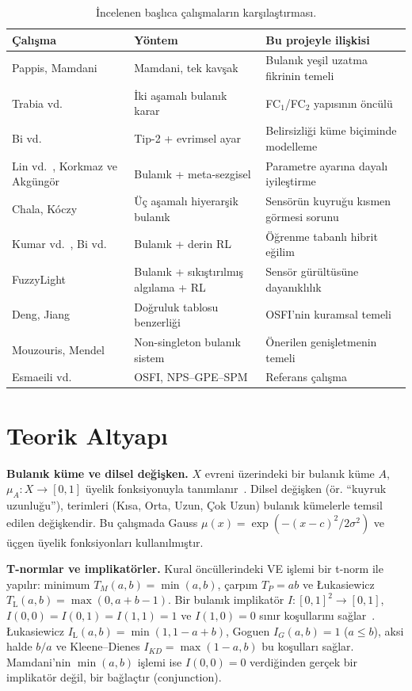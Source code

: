 \documentclass[11pt,a4paper]{article}
\theoremstyle{definition}
\newcommand{\Luk}{\mathrm{L}}
\begin{document}
\begin{table}[t]
\centering
\caption{İncelenen başlıca çalışmaların karşılaştırması.}
\label{tab:lit}
\small
\begin{tabularx}{\textwidth}{@{}p{3.1cm}p{3.6cm}X@{}}
\toprule
Çalışma & Yöntem & Bu projeyle ilişkisi \\
\midrule
Pappis, Mamdani~\cite{pappis1977} & Mamdani, tek kavşak & Bulanık yeşil uzatma fikrinin temeli \\
Trabia vd.~\cite{trabia1999} & İki aşamalı bulanık karar & FC$_1$/FC$_2$ yapısının öncülü \\
Bi vd.~\cite{bi2014,bi2018} & Tip-2 + evrimsel ayar & Belirsizliği küme biçiminde modelleme \\
Lin vd.~\cite{lin2023}, Korkmaz ve Akgüngör~\cite{korkmaz2024} & Bulanık + meta-sezgisel & Parametre ayarına dayalı iyileştirme \\
Chala, Kóczy~\cite{chala2024} & Üç aşamalı hiyerarşik bulanık & Sensörün kuyruğu kısmen görmesi sorunu \\
Kumar vd.~\cite{kumar2021}, Bi vd.~\cite{bi2024electronics} & Bulanık + derin RL & Öğrenme tabanlı hibrit eğilim \\
FuzzyLight~\cite{li2025fuzzylight} & Bulanık + sıkıştırılmış algılama + RL & Sensör gürültüsüne dayanıklılık \\
Deng, Jiang~\cite{deng2014osfi} & Doğruluk tablosu benzerliği & OSFI'nin kuramsal temeli \\
Mouzouris, Mendel~\cite{mouzouris1997} & Non-singleton bulanık sistem & Önerilen genişletmenin temeli \\
Esmaeili vd.~\cite{esmaeili2025osfi} & OSFI, NPS--GPE--SPM & Referans çalışma \\
\bottomrule
\end{tabularx}
\end{table}

\section{Teorik Altyapı}
\label{sec:theory}

\textbf{Bulanık küme ve dilsel değişken.} $X$ evreni üzerindeki bir bulanık küme $A$, $\mu_A:X\to[0,1]$ üyelik fonksiyonuyla tanımlanır~\cite{zadeh1965}. Dilsel değişken (ör. ``kuyruk uzunluğu''), terimleri (Kısa, Orta, Uzun, Çok Uzun) bulanık kümelerle temsil edilen değişkendir. Bu çalışmada Gauss $\mu(x)=\exp(-(x-c)^2/2\sigma^2)$ ve üçgen üyelik fonksiyonları kullanılmıştır.

\textbf{T-normlar ve implikatörler.} Kural öncüllerindeki VE işlemi bir t-norm ile yapılır: minimum $T_M(a,b)=\min(a,b)$, çarpım $T_P=ab$ ve Łukasiewicz $T_\Luk(a,b)=\max(0,a+b-1)$. Bir bulanık implikatör $I:[0,1]^2\to[0,1]$, $I(0,0)=I(0,1)=I(1,1)=1$ ve $I(1,0)=0$ sınır koşullarını sağlar~\cite{deng2014osfi}. Łukasiewicz $I_\Luk(a,b)=\min(1,1-a+b)$, Goguen $I_G(a,b)=1$ ($a\le b$), aksi halde $b/a$ ve Kleene--Dienes $I_{KD}=\max(1-a,b)$ bu koşulları sağlar. Mamdani'nin $\min(a,b)$ işlemi ise $I(0,0)=0$ verdiğinden gerçek bir implikatör değil, bir bağlaçtır (conjunction).
\end{document}
